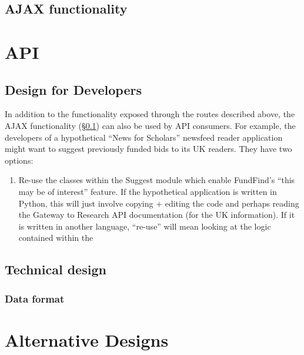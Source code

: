 \subsection{AJAX functionality}
\label{design-ajax}

\section{API}
  \subsection{Design for Developers}
    
    In addition to the functionality exposed through the routes described above, the AJAX functionality (\S\ref{design-ajax}) can also be used by API consumers. For example, the developers of a hypothetical ``News for Scholars'' newsfeed reader application might want to suggest previously funded bids to its UK readers. They have two options:
    
    \begin{enumerate}
     \item Re-use the classes within the Suggest module which enable FundFind's ``this may be of interest'' feature. If the hypothetical application is written in Python, this will just involve copying $+$ editing the code and perhaps reading the Gateway to Research API documentation (for the UK information). If it is written in another language, ``re-use'' will mean looking at the logic contained within the 
    \end{enumerate}

  \subsection{Technical design}
  \label{api-tech-design}
  \subsubsection{Data format}
 
\section{Alternative Designs}